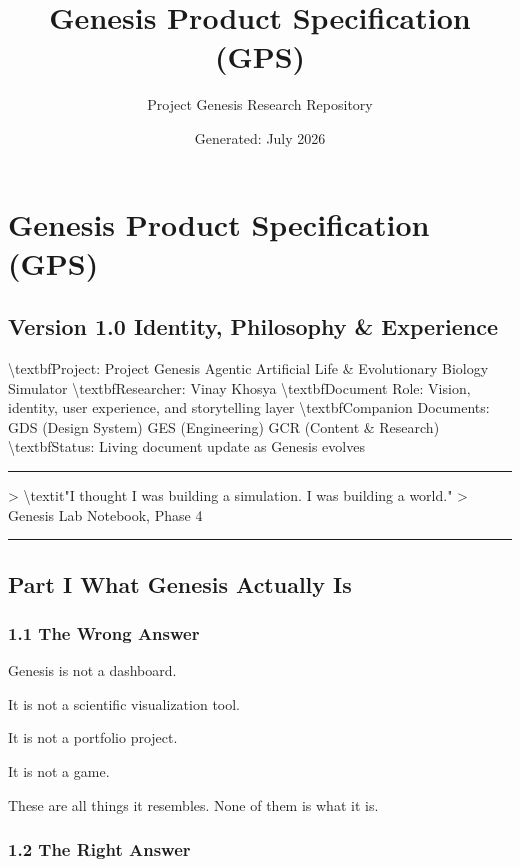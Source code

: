 \documentclass[11pt,a4paper]{article}
\title{\textbf{Genesis Product Specification (GPS)}}
\author{Project Genesis Research Repository}
\date{\small Generated: July 2026}
\begin{document}
\maketitle
\thispagestyle{empty}

\newpage
\section*{Genesis Product Specification (GPS)}
\subsection*{Version 1.0  Identity, Philosophy \& Experience}

\textbackslash{}textbf{Project:} Project Genesis  Agentic Artificial Life \& Evolutionary Biology Simulator
\textbackslash{}textbf{Researcher:} Vinay Khosya
\textbackslash{}textbf{Document Role:} Vision, identity, user experience, and storytelling layer
\textbackslash{}textbf{Companion Documents:} GDS (Design System)  GES (Engineering)  GCR (Content \& Research)
\textbackslash{}textbf{Status:} Living document  update as Genesis evolves

\noindent\rule{\textwidth}{0.4pt}

\textgreater{} \textbackslash{}textit{"I thought I was building a simulation. I was building a world."}
\textgreater{}  Genesis Lab Notebook, Phase 4

\noindent\rule{\textwidth}{0.4pt}

\subsection*{Part I  What Genesis Actually Is}

\subsubsection*{1.1 The Wrong Answer}

Genesis is not a dashboard.

It is not a scientific visualization tool.

It is not a portfolio project.

It is not a game.

These are all things it resembles. None of them is what it is.

\subsubsection*{1.2 The Right Answer}
\end{document}

